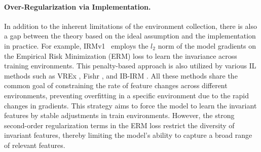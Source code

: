 
\paragraph{Over-Regularization via Implementation.}
In addition to the inherent limitations of the environment collection, there is also a gap between the theory based on the ideal assumption and the implementation in practice.
For example, IRMv1~\citep{irmv1} employs the $l_2$ norm of the model gradients on the Empirical Risk Minimization (ERM) loss to learn the invariance across training environments. 
This penalty-based approach is also utilized by various IL methods such as VREx \citep{v-rex}, Fishr \citep{fishr}, and IB-IRM \citep{ib-irm}. 
All these methods share the common goal of constraining the rate of feature changes across different environments, preventing overfitting in a specific environment due to the rapid changes in gradients. 
This strategy aims to force the model to learn the invariant features by stable adjustments in train environments. However, the strong second-order regularization terms in the ERM loss restrict the diversity of invariant features, thereby limiting the model's ability to capture a broad range of relevant features. 

 



